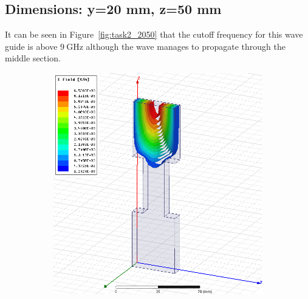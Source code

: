 \documentclass[12pt,a4paper]{article}
\begin{document}
\subsection{Dimensions: y=20 mm, z=50 mm}
It can be seen in Figure~\ref{fig:task2_2050} that the cutoff frequency for this wave guide is above $\SI{9}{\giga\hertz}$ although the wave manages to propagate through the middle section.
\begin{figure}
  \centering
  \begin{subfigure}[b]{0.49\textwidth}
    \includegraphics[width=\textwidth]{./mid_sec_20mm_wide_50mm_long/4ghz.png}
    \label{fig:2_2050_4ghz}
  \end{subfigure}
  \begin{subfigure}[b]{0.49\textwidth}

\end{subfigure}
\end{figure}
\end{document}
